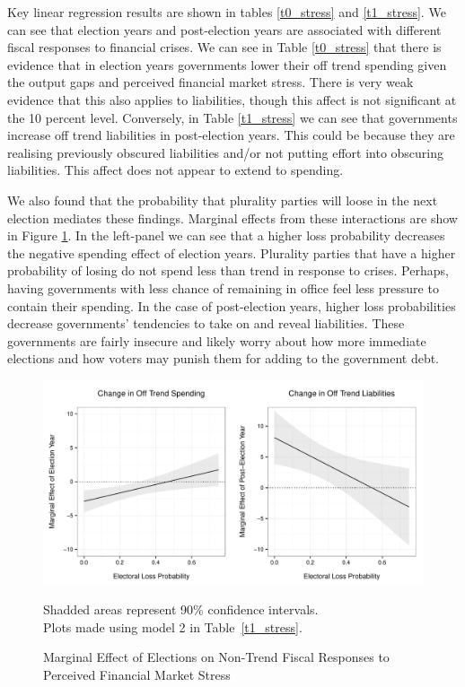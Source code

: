\documentclass[]{article}
\begin{document}
Key linear regression results are shown in tables \ref{t0_stress} and \ref{t1_stress}. We can see that election years and post-election years are associated with different fiscal responses to financial crises. We can see in Table \ref{t0_stress} that there is evidence that in election years governments lower their off trend spending given the output gaps and perceived financial market stress. There is very weak evidence that this also applies to liabilities, though this affect is not significant at the 10 percent level. Conversely, in Table \ref{t1_stress} we can see that governments increase off trend liabilities in post-election years. This could be because they are realising previously obscured liabilities and/or not putting effort into obscuring liabilities. This affect does not appear to extend to spending.

We also found that the probability that plurality parties will loose in the next election mediates these findings. Marginal effects from these interactions are show in Figure \ref{me_stress}. In the left-panel we can see that a higher loss probability decreases the negative spending effect of election years. Plurality parties that have a higher probability of losing do not spend less than trend in response to crises. Perhaps, having governments with less chance of remaining in office feel less pressure to contain their spending. In the case of post-election years, higher loss probabilities decrease governments' tendencies to take on and reveal liabilities. These governments are fairly insecure and likely worry about how more immediate elections and how voters may punish them for adding to the government debt. 


\begin{figure}
    \caption{Marginal Effect of Elections on Non-Trend Fiscal Responses to Perceived Financial Market Stress}
    \label{me_stress}

    \begin{center}
        \includegraphics[scale=0.7]{analysis/figures/me_stress.pdf}
    \end{center}

    {\scriptsize{Shadded areas represent 90\% confidence intervals. \\
    Plots made using model 2 in Table~\ref{t1_stress}.}}

\end{figure}
\end{document}
